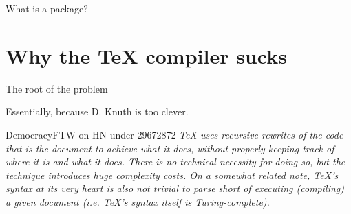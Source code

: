 \documentclass[xetex, onlymath, handout]{beamer}
\begin{document}
\begin{frame}[fragile]{What is a package?}
\begin{figure}[H]
  \end{figure}
\end{frame}

\section{Why the \TeX{} compiler sucks}

\begin{frame}{The root of the problem}
  
  {\Large 
    Essentially, because D. Knuth is too clever.
  }
  
  \begin{block}{DemocracyFTW on HN under 29672872}
    \itshape
    TeX uses recursive rewrites of the code that is the document to achieve
    what it does, without properly keeping track of where it is and what it
    does. There is no technical necessity for doing so, but the technique
    introduces huge complexity costs. On a somewhat related note, TeX's syntax
    at its very heart is also not trivial to parse short of executing
    (compiling) a given document (i.e. TeX's syntax itself is Turing-complete).
  \end{block}
\end{frame}

\makeatletter
\def\tower{\@ifnextchar[%
  {\def\endtower{}\towerstep}%
  {}%
}%
\def\towerstep[#1]{#1%
  \@ifnextchar[%
    {\edef\endtower{\endtower\egroup}%
    ^\bgroup\towerstep}{\endtower}%
}
\makeatother
\end{document}
